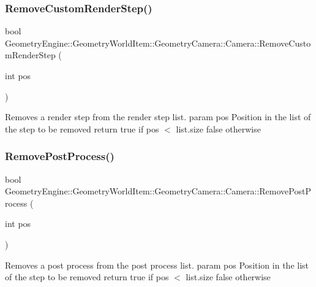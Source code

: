 \subsubsection{\texorpdfstring{RemoveCustomRenderStep()}{RemoveCustomRenderStep()}}
{\footnotesize\ttfamily bool Geometry\+Engine\+::\+Geometry\+World\+Item\+::\+Geometry\+Camera\+::\+Camera\+::\+Remove\+Custom\+Render\+Step (\begin{DoxyParamCaption}\item[{int}]{pos }\end{DoxyParamCaption})\hspace{0.3cm}{\ttfamily [virtual]}}

Removes a render step from the render step list. param pos Position in the list of the step to be removed return true if pos $<$ list.\+size false otherwise \mbox{\label{class_geometry_engine_1_1_geometry_world_item_1_1_geometry_camera_1_1_camera_ae66b1cfa82e67349786b3cf412f93e70}} 
\subsubsection{\texorpdfstring{RemovePostProcess()}{RemovePostProcess()}}
{\footnotesize\ttfamily bool Geometry\+Engine\+::\+Geometry\+World\+Item\+::\+Geometry\+Camera\+::\+Camera\+::\+Remove\+Post\+Process (\begin{DoxyParamCaption}\item[{int}]{pos }\end{DoxyParamCaption})\hspace{0.3cm}{\ttfamily [virtual]}}

Removes a post process from the post process list. param pos Position in the list of the step to be removed return true if pos $<$ list.\+size false otherwise \mbox{\label{class_geometry_engine_1_1_geometry_world_item_1_1_geometry_camera_1_1_camera_aea364f3b5f2aecabcb240825988d6bee}} 
